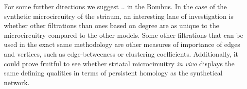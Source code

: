 For some further directions we suggest .. in the Bombus. In the case of the synthetic microcircuitry of the striaum, an interesting lane of investigation is whether other filtrations than ones based on degree are as unique to the microcircuitry compared to the other models. Some other filtrations that can be used in the exact same methodology are other measures of importance of edges and vertices, such as edge-betweeness or clustering coefficients. Additionally, it could prove fruitful to see whether striatal microcircuitry \textit{in vivo} displays the same defining qualities in terms of persistent homology as the synthetical network.

